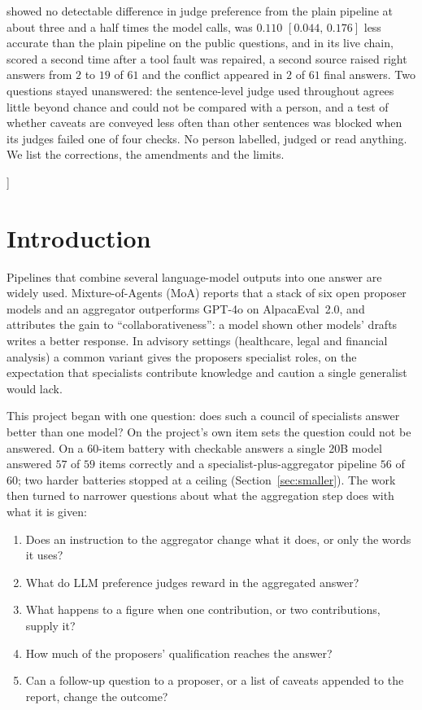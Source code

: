 \documentclass[10pt,twocolumn]{article}
\newcommand{\ci}[2]{\ensuremath{[#1,\,#2]}}
\begin{document}
\begin{@twocolumnfalse}
\begin{center}
\begin{minipage}{0.9\textwidth}
showed no detectable difference in judge preference from the plain
pipeline at about three and a half times the model calls, was $0.110$
\ci{0.044}{0.176} less accurate than the plain pipeline on the public
questions, and in its live chain, scored a second time after a tool
fault was repaired, a second source raised right answers from $2$ to
$19$ of $61$ and the conflict appeared in $2$ of $61$ final answers. Two
questions
stayed unanswered: the sentence-level judge used throughout agrees
little beyond chance and could not be compared with a person, and a
test of whether caveats are conveyed less often than other sentences
was blocked when its judges failed one of four checks. No person
labelled, judged or read anything. We list the corrections, the
amendments and the limits.
\end{minipage}
\end{center}
\vspace{1.2em}
\end{@twocolumnfalse}
]

\section{Introduction}
\label{sec:intro}

Pipelines that combine several language-model outputs into one answer
are widely used. Mixture-of-Agents (MoA) \cite{wang2024moa} reports
that a stack of six open proposer models and an aggregator outperforms
GPT-4o on AlpacaEval~2.0, and attributes the gain to
``collaborativeness'': a model shown other models' drafts writes a
better response. In advisory settings (healthcare, legal and financial
analysis) a common variant gives the proposers specialist roles, on the
expectation that specialists contribute knowledge and caution a single
generalist would lack.

This project began with one question: does such a council of
specialists answer better than one model? On the project's own item
sets the question could not be answered. On a 60-item
battery with checkable answers a single 20B model answered $57$ of $59$
items correctly and a specialist-plus-aggregator pipeline $56$ of $60$;
two harder batteries stopped at a ceiling
(Section~\ref{sec:smaller}). The work then turned to narrower questions
about what the aggregation step does with what it is given:

\begin{enumerate}\itemsep0pt
\item Does an instruction to the aggregator change what it does, or
only the words it uses?
\item What do LLM preference judges reward in the aggregated answer?
\item What happens to a figure when one contribution, or two
contributions, supply it?
\item How much of the proposers' qualification reaches the answer?
\item Can a follow-up question to a proposer, or a list of caveats
appended to the report, change the outcome?
\end{enumerate}
\end{document}
